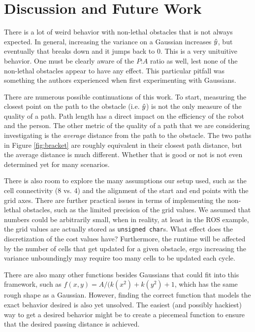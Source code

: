 \section{Discussion and Future Work}
There is a lot of weird behavior with non-lethal obstacles that is not always expected. In general, increasing the variance on a Gaussian increases $\hat{y}$, but eventually that breaks down and it jumps back to 0. This is a very unituitive behavior. One must be clearly aware of the $P$:$A$ ratio as well, lest none of the non-lethal obstacles appear to have any effect. This particular pitfall was something the authors experienced when first experimenting with Gaussians. 

There are numerous possible continuations of this work. To start, measuring the closest point on the path to the obstacle (i.e. $\hat{y}$) is not the only measure of the quality of a path. Path length has a direct impact on the efficiency of the robot and the person. The other metric of the quality of a path that we are considering investigating is the \emph{average} distance from the path to the obstacle. The two paths in Figure \ref{fig:bracket} are roughly equivalent in their closest path distance, but the average distance is much different. Whether that is good or not is not even determined yet for many scenarios. 

There is also room to explore the many assumptions our setup used, such as the cell connectivity (8 vs. 4) and the alignment of the start and end points with the grid axes. There are further practical issues in terms of implementing the non-lethal obstacles, such as the limited precision of the grid values. We assumed that numbers could be arbitrarily small, when in reality, at least in the ROS example, the grid values are actually stored as \texttt{unsigned char}s. What effect does the discretization of the cost values have? Furthermore, the runtime will be affected by the number of cells that get updated for a given obstacle, ergo increasing the variance unboundingly may require too many cells to be updated each cycle. 

There are also many other functions besides Gaussians that could fit into this framework, such as $f(x,y) = A/(k(x^2) + k(y^2) + 1$, which has the same rough shape as a Gaussian. However, finding the correct function that models the exact behavior desired is also yet unsolved. The easiest (and possibly hackiest) way to get a desired behavior might be to create a piecemeal function to ensure that the desired passing distance is achieved. 



